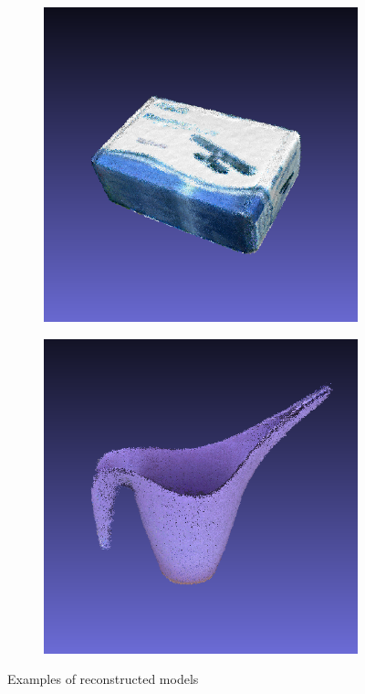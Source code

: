 \documentclass[letterpaper, 10 pt, conference]{ieeeconf}  %
\begin{document}
\begin{figure}[th]
        \begin{subfigure}[b]{0.5\linewidth}
                \centering
                \includegraphics[width=\linewidth]{../models/asus_box.png}
        \end{subfigure}%
        \begin{subfigure}[b]{0.5\linewidth}
                \centering
                \includegraphics[width=\linewidth]{../models/watering_can.png}
        \end{subfigure}
        \caption{Examples of reconstructed models}
        \label{fig:results}
\end{figure}
\end{document}
